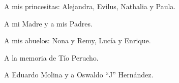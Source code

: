 	A mis princesitas: Alejandra, Evilus, Nathalia y Paula. \par
	A mi Madre y a mis Padres. \par
	A mis abuelos: Nona y Remy, Lucía y Enrique. \par
	A la memoria de Tío Perucho. \par
	A Eduardo Molina y a Oswaldo “J” Hernández. \par
